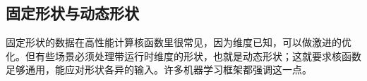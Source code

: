 \subsection*{固定形状与动态形状}

固定形状的数据在高性能计算核函数里很常见，因为维度已知，可以做激进的优化。但有些场景必须处理带运行时维度的形状，也就是动态形状；这就要求核函数足够通用，能应对形状各异的输入。许多机器学习框架都强调这一点。
